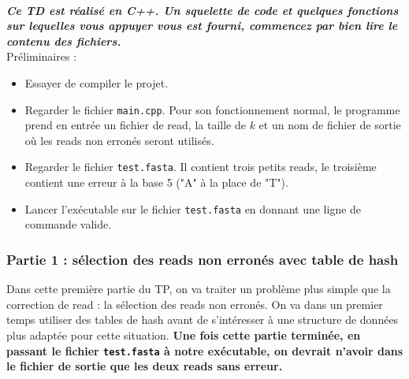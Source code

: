 \documentclass{article}
\begin{document}
\noindent{}\\


\textit{\textbf{Ce TD est réalisé en C++. Un squelette de code et quelques fonctions sur lequelles vous appuyer vous est fourni, commencez par bien lire le contenu des fichiers.}}\\
Préliminaires :
\begin{itemize}
  \item Essayer de compiler le projet.
  \item Regarder le fichier \texttt{main.cpp}. Pour son fonctionnement normal, le programme prend en entrée un fichier de read, la taille de $k$ et un nom de fichier de sortie où les reads non erronés seront utilisés.\\
  \item Regarder le fichier  \texttt{test.fasta}. Il contient trois petits reads, le troisième contient une erreur à la base 5 ("A" à la place de "T").
  \item Lancer l'exécutable sur le fichier \texttt{test.fasta} en donnant une ligne de commande valide.
\end{itemize}

\subsubsection*{Partie 1 : sélection des reads non erronés avec table de hash}
Dans cette première partie du TP, on va traiter un problème plus simple que la correction de read : la sélection des reads non erronés. On va dans un premier temps utiliser des tables de hash avant de s'intéresser à une structure de données plus adaptée pour cette situation. \textbf{Une fois cette partie terminée, en passant le fichier \texttt{test.fasta} à notre exécutable, on devrait n'avoir dans le fichier de sortie que les deux reads sans erreur.}\\

\noindent{}\\
\end{document}
